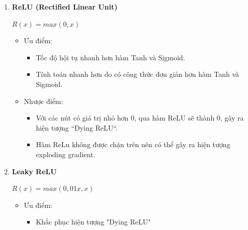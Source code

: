 \begin{enumerate}
    \item \textbf{ReLU (Rectified Linear Unit)}
    \begin{center}
        \large $R(x) = max(0,x)$
        \end{center}
    \begin{itemize}
        \item Ưu điểm: 
        \begin{itemize}
            \item Tốc độ hội tụ nhanh hơn hàm Tanh và Sigmoid.
            \item Tính toán nhanh hơn do có công thức đơn giản hơn hàm Tanh và Sigmoid.
        \end{itemize}
        \item Nhược điểm:
        \begin{itemize}
            \item Với các nút có giá trị nhỏ hơn 0, qua hàm ReLU sẽ thành 0, gây ra hiện tượng “Dying ReLU“.
            \item Hàm ReLu không được chặn trên nên có thể gây ra hiện tượng exploding gradient.
        \end{itemize}
    \end{itemize}
    \item \textbf{Leaky ReLU}
    \begin{center}
        \large $R(x) = max(0,01x,x)$
    \end{center}
    \begin{itemize}
        \item Ưu điểm: 
        \begin{itemize}
            \item Khắc phục hiện tượng "Dying ReLU"
        \end{itemize}
    \end{itemize}
\end{enumerate}


